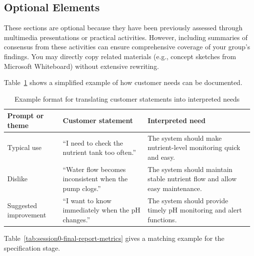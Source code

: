 \subsection{Optional Elements}
These sections are optional because they have been previously assessed through multimedia presentations or practical activities. However, including summaries of consensus from these activities can ensure comprehensive coverage of your group's findings. You may directly copy related materials (e.g., concept sketches from Microsoft Whiteboard) without extensive rewriting.




Table~\ref{tab:session0-final-report-needs} shows a simplified example of how customer needs can be documented.

\begin{table}[htbp]
\centering
\caption{Example format for translating customer statements into interpreted needs}
\label{tab:session0-final-report-needs}
\renewcommand{\arraystretch}{1.2}
\begin{tabularx}{\textwidth}{|>{\raggedright\arraybackslash}p{}|>{\raggedright\arraybackslash}X|>{\raggedright\arraybackslash}X|}
\hline
\textbf{Prompt or theme} & \textbf{Customer statement} & \textbf{Interpreted need} \\
\hline
Typical use & ``I need to check the nutrient tank too often.'' & The system should make nutrient-level monitoring quick and easy. \\
\hline
Dislike & ``Water flow becomes inconsistent when the pump clogs.'' & The system should maintain stable nutrient flow and allow easy maintenance. \\
\hline
Suggested improvement & ``I want to know immediately when the pH changes.'' & The system should provide timely pH monitoring and alert functions. \\
\hline
\end{tabularx}
\end{table}

Table~\ref{tab:session0-final-report-metrics} gives a matching example for the specification stage.

